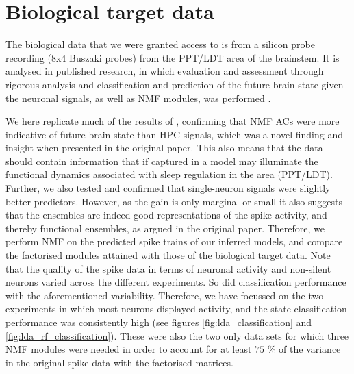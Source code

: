 \documentclass[mphil,deptreport,ianc]{infthesis} %
\begin{document}



\section{Biological target data}
\label{subsect:bio_data}

The biological data that we were granted access to is from a silicon probe recording (8x4 Buszaki probes) from the PPT/LDT area of the brainstem. 
It is analysed in published research, in which evaluation and assessment through rigorous analysis and classification and prediction of the future brain state given the neuronal signals, as well as NMF modules, was performed \cite{Tsunematsu2019}. 

We here replicate much of the results of \cite{Tsunematsu2019}, confirming that NMF ACs were more indicative of future brain state than HPC signals, which was a novel finding and insight when presented in the original paper.
This also means that the data should contain information that if captured in a model may illuminate the functional dynamics associated with sleep regulation in the area (PPT/LDT).
Further, we also tested and confirmed that single-neuron signals were slightly better predictors. 
However, as the gain is only marginal or small it also suggests that the ensembles are indeed good representations of the spike activity, and thereby functional ensembles, as argued in the original paper.
Therefore, we perform NMF on the predicted spike trains of our inferred models, and compare the factorised modules attained with those of the biological target data.
Note that the quality of the spike data in terms of neuronal activity and non-silent neurons varied across the different experiments.
So did classification performance with the aforementioned variability.
Therefore, we have focussed on the two experiments in which most neurons displayed activity, and the state classification performance was consistently high (see figures \ref{fig:lda_classification} and \ref{fig:lda_rf_classification}).
These were also the two only data sets for which three NMF modules were needed in order to account for at least $75$ \% of the variance in the original spike data with the factorised matrices.
\end{document}
